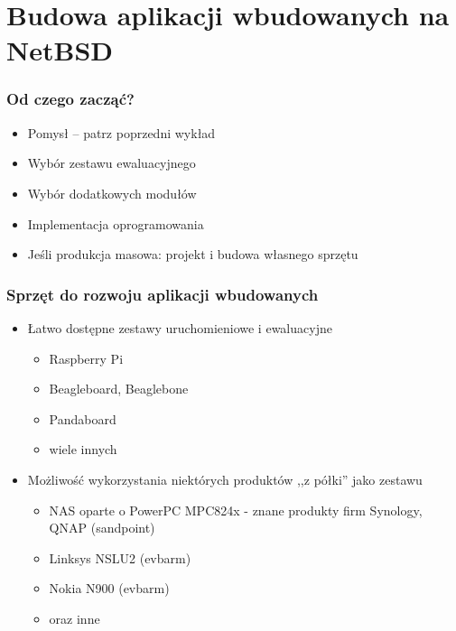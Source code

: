 \documentclass[dvipsnames,table]{beamer}
\begin{document}
\section{Budowa aplikacji wbudowanych na NetBSD}

\begin{frame}
\frametitle{Od czego zacząć?}
\begin{itemize}
	\item Pomysł -- patrz poprzedni wykład {\Large \smiley}
	\item Wybór zestawu ewaluacyjnego
	\item Wybór dodatkowych modułów
	\item Implementacja oprogramowania
	\item Jeśli produkcja masowa: projekt i budowa własnego sprzętu
\end{itemize}
\end{frame}	


\begin{frame}
\frametitle{Sprzęt do rozwoju aplikacji wbudowanych}
\begin{itemize}
	\item Łatwo dostępne zestawy uruchomieniowe i ewaluacyjne
	\begin{itemize}
		\item Raspberry Pi
		\item Beagleboard, Beaglebone
		\item Pandaboard
		\item wiele innych

	\end{itemize}
	\item Możliwość wykorzystania niektórych produktów ,,z półki'' jako zestawu
	\begin{itemize}
		\item NAS oparte o PowerPC MPC824x - znane produkty firm Synology, QNAP (sandpoint)
		\item Linksys NSLU2 (evbarm)
		\item Nokia N900 (evbarm)
		\item oraz inne
	\end{itemize}
\end{itemize}
\end{frame}
\end{document}
